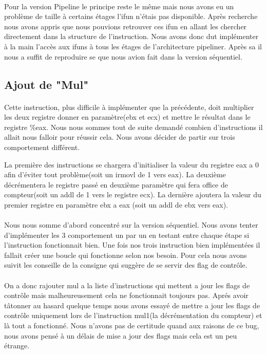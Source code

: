 \documentclass[12pt]{article}
\begin{document}
\paragraph{}Pour la version Pipeline le principe reste le même mais nous avons eu un problème de taille à certains étages l'ifun n'étais pas disponible. Après recherche nous avons appris que nous pouvions retrouver ces ifun en allant les chercher directement dans la structure de l'instruction. Nous avons donc dut implémenter à la main l’accès aux ifuns à tous les étages de l’architecture pipeliner. Après sa il nous a suffit de reproduire se que nous avion fait dans la version séquentiel.

\subsection{Ajout de "Mul"}

\paragraph{} Cette instruction, plus difficile à implémenter que la précédente, doit multiplier les deux registre donner en paramètre(ebx et ecx) et mettre le résultat dans le registre \%eax. Nous nous sommes tout de suite demandé combien d'instructions il allait nous falloir pour réussir cela. Nous avons décider de partir sur trois comportement différent.

\paragragh{} La première des instructions se chargera d'initialiser la valeur du registre eax a 0 afin d'éviter tout problème(soit un irmovl de 1 vers eax). La deuxième décrémentera le registre passé en deuxième paramètre qui fera office de compteur(soit un addl de 1 vers le registre ecx). La dernière ajoutera la valeur du premier registre en paramètre ebx a eax (soit un addl de ebx vers eax).

\paragraph{} Nous nous somme d’abord concentré sur la version séquentiel. Nous avons tenter d’implémenter les 3 comportement un par un en testant entre chaque étape si l'instruction fonctionnait bien. Une fois nos trois instruction bien implémentées il fallait créer une boucle qui fonctionne selon nos besoin. Pour cela nous avons suivit les conseille de la consigne qui suggère de se servir des flag de contrôle.

\paragraph{} On a donc rajouter mul a la liste d'instructions qui mettent a jour les flags de contrôle mais malheureusement cela ne fonctionnait toujours pas. Aprés avoir tâtonner au hasard quelque temps nous avons essayé de mettre a jour les flags de contrôle uniquement lors de l'instruction mul1(la décrémentation du compteur) et là tout a fonctionné. Nous n'avons pas de certitude quand aux raisons de ce bug, nous avons pensé à un délais de mise a jour des flags mais cela est un peu étrange.
\end{document}
